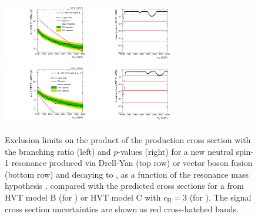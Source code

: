 \begin{figure}[htbp]
  \centering
  \includegraphics[width=0.33\textwidth]{fig/results/limits_ZprToWW.pdf}
  \includegraphics[width=0.33\textwidth]{fig/results/pvalue_ZprToWW.pdf}\\
  \includegraphics[width=0.33\textwidth]{fig/results/limits_VBFZprToWW.pdf}
  \includegraphics[width=0.33\textwidth]{fig/results/pvalue_VBFZprToWW.pdf}
  \caption{
    Exclusion limits on the product of the production cross section with the branching ratio (left) and $p$-values (right) for a new neutral spin-1 resonance produced via Drell-Yan (top row) or vector boson fusion (bottom row) and decaying to \WW, as a function of the resonance mass hypothesis \MX, compared with the predicted cross sections for a \Zpr from HVT model B (for \DY) or HVT model C with $c_\mathrm{H}=3$ (for \VBF).
    The signal cross section uncertainties are shown as red cross-hatched bands.
  }
  \label{fig:limits_pvalue_spin1_neut}
\end{figure}

